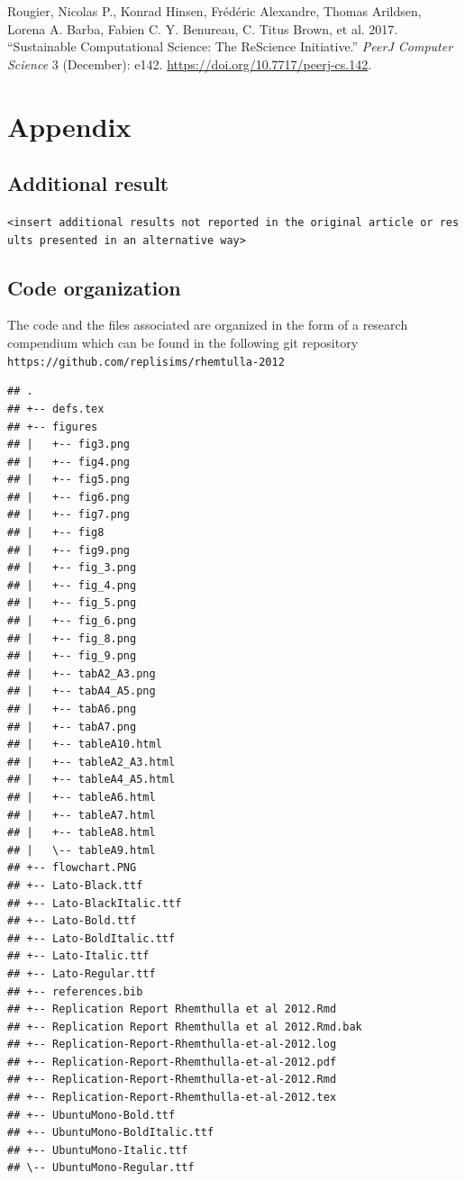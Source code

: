 \documentclass[10,a4paperpaper,]{article}
\newenvironment{CSLReferences}%
  {}%
  {\par}
\begin{document}
\hypertarget{refs}{}
\begin{CSLReferences}{1}{0}
\leavevmode{}%
Rougier, Nicolas P., Konrad Hinsen, Frédéric Alexandre, Thomas Arildsen,
Lorena A. Barba, Fabien C. Y. Benureau, C. Titus Brown, et al. 2017.
{``Sustainable Computational Science: The {ReScience} Initiative.''}
\emph{PeerJ Computer Science} 3 (December): e142.
\url{https://doi.org/10.7717/peerj-cs.142}.

\end{CSLReferences}

\FloatBarrier
\endgroup
\newpage

\section*{Appendix}

\subsection*{Additional result}

\texttt{\textless{}insert\ additional\ results\ not\ reported\ in\ the\ original\ article\ or\ results\ presented\ in\ an\ alternative\ way\textgreater{}}

\subsection{Code organization}

The code and the files associated are organized in the form of a
research compendium which can be found in the following git repository
\texttt{https://github.com/replisims/rhemtulla-2012}

\begin{verbatim}
## .
## +-- defs.tex
## +-- figures
## |   +-- fig3.png
## |   +-- fig4.png
## |   +-- fig5.png
## |   +-- fig6.png
## |   +-- fig7.png
## |   +-- fig8
## |   +-- fig9.png
## |   +-- fig_3.png
## |   +-- fig_4.png
## |   +-- fig_5.png
## |   +-- fig_6.png
## |   +-- fig_8.png
## |   +-- fig_9.png
## |   +-- tabA2_A3.png
## |   +-- tabA4_A5.png
## |   +-- tabA6.png
## |   +-- tabA7.png
## |   +-- tableA10.html
## |   +-- tableA2_A3.html
## |   +-- tableA4_A5.html
## |   +-- tableA6.html
## |   +-- tableA7.html
## |   +-- tableA8.html
## |   \-- tableA9.html
## +-- flowchart.PNG
## +-- Lato-Black.ttf
## +-- Lato-BlackItalic.ttf
## +-- Lato-Bold.ttf
## +-- Lato-BoldItalic.ttf
## +-- Lato-Italic.ttf
## +-- Lato-Regular.ttf
## +-- references.bib
## +-- Replication Report Rhemthulla et al 2012.Rmd
## +-- Replication Report Rhemthulla et al 2012.Rmd.bak
## +-- Replication-Report-Rhemthulla-et-al-2012.log
## +-- Replication-Report-Rhemthulla-et-al-2012.pdf
## +-- Replication-Report-Rhemthulla-et-al-2012.Rmd
## +-- Replication-Report-Rhemthulla-et-al-2012.tex
## +-- UbuntuMono-Bold.ttf
## +-- UbuntuMono-BoldItalic.ttf
## +-- UbuntuMono-Italic.ttf
## \-- UbuntuMono-Regular.ttf
\end{verbatim}
\end{document}
